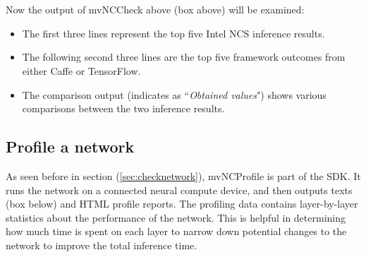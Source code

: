 \begin{mycolorbox}[colback=light-gray]
	{\tiny\texttt{}}
\end{mycolorbox}
%
\\\\Now the output of mvNCCheck above (box above) will be examined:
\begin{itemize}
\item The first three lines represent the top five Intel NCS inference results. 
\item The following second three lines are the top five framework outcomes from 
either Caffe or TensorFlow.
\item The comparison output (indicates as ``\emph{Obtained values}") shows 
various comparisons between the two inference results.
\end{itemize}
%
\subsection{Profile a network}
As seen before in section (\ref{sec:checknetwork}), mvNCProfile is part of the 
SDK. It runs the network on a connected neural 
compute device, and then outputs texts (box below) and HTML profile reports.
The profiling data contains layer-by-layer statistics about the performance of 
the network. 
This is helpful in determining how much time is spent on each layer to narrow 
down potential changes to the network to improve the total inference time.\newpage
{\tiny\texttt{}}
%
